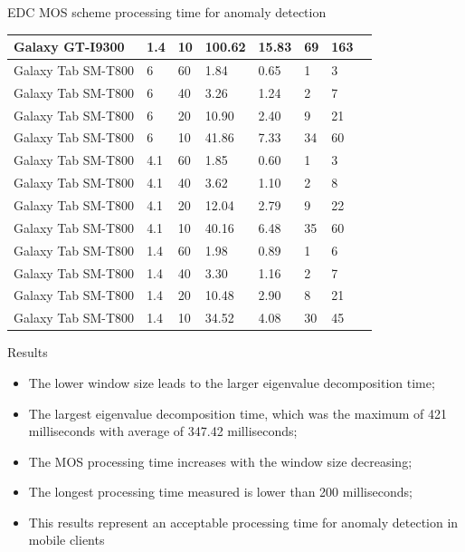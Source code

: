 \documentclass[newPxFont, numfooter, sectionpages]{beamer}
\begin{document}
\begin{frame}[c]{EDC MOS scheme processing time for anomaly detection}
\begin{table}[!t]
\begin{tabular}{|l|l|l|l|l|l|l|l|}
			Galaxy GT-I9300	& 1.4	& 10	& 100.62	& 15.83	& 69	& 163	\\ \hline
			Galaxy Tab SM-T800	& 6	& 60	& 1.84	& 0.65	& 1	& 3	\\ \hline
			Galaxy Tab SM-T800	& 6	& 40	& 3.26	& 1.24	& 2	& 7	\\ \hline
			Galaxy Tab SM-T800	& 6	& 20	& 10.90	& 2.40	& 9	& 21	\\ \hline
			Galaxy Tab SM-T800	& 6	& 10	& 41.86	& 7.33	& 34	& 60	\\ \hline
			Galaxy Tab SM-T800	& 4.1	& 60	& 1.85	& 0.60	& 1	& 3	\\ \hline
			Galaxy Tab SM-T800	& 4.1	& 40	& 3.62	& 1.10	& 2	& 8	\\ \hline
			Galaxy Tab SM-T800	& 4.1	& 20	& 12.04	& 2.79	& 9	& 22	\\ \hline
			Galaxy Tab SM-T800	& 4.1	& 10	& 40.16	& 6.48	& 35	& 60	\\ \hline
			Galaxy Tab SM-T800	& 1.4	& 60	& 1.98	& 0.89	& 1	& 6	\\ \hline
			Galaxy Tab SM-T800	& 1.4	& 40	& 3.30	& 1.16	& 2	& 7	\\ \hline
			Galaxy Tab SM-T800	& 1.4	& 20	& 10.48	& 2.90	& 8	& 21	\\ \hline
			Galaxy Tab SM-T800	& 1.4	& 10	& 34.52	& 4.08	& 30	& 45	\\ \hline
		\end{tabular}
	\end{table}
	
\end{frame}
\begin{frame}[c]{Results}
	
	\begin{itemize}
		\item The lower window size leads to the larger eigenvalue decomposition time;
		\item The largest eigenvalue decomposition time, which was the maximum of 421 milliseconds with average of 347.42 milliseconds;
		\item The MOS processing time increases with the window size decreasing;
		\item The longest processing time measured is lower than 200 milliseconds;
		\item This results represent an acceptable processing time for anomaly detection in mobile clients
	\end{itemize}
	
\end{frame}
\end{document}
